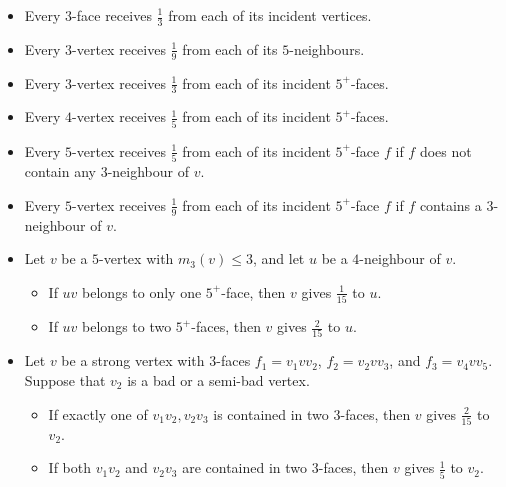\documentclass[12pt, reqno]{amsart}
\theoremstyle{plain}
\theoremstyle{definition}
\numberwithin{equation}{section}
\begin{document}
\begin{itemize}
\item[\textbf{R1:}] Every $3$-face  receives $\frac{1}{3}$  from each of its incident vertices.
\item[\textbf{R2:}] Every $3$-vertex receives $\frac{1}{9}$  from each of its  $5$-neighbours.
\item[\textbf{R3:}] Every $3$-vertex receives $\frac{1}{3}$  from each of its  incident $5^+$-faces.
\item[\textbf{R4:}] Every $4$-vertex receives $\frac{1}{5}$  from each of its  incident $5^+$-faces.
\item[\textbf{R5:}] Every $5$-vertex receives $\frac{1}{5}$  from each of its  incident $5^+$-face $f$ if $f$ does not contain any $3$-neighbour of $v$.
\item[\textbf{R6:}] Every $5$-vertex receives $\frac{1}{9}$  from each of its  incident $5^+$-face $f$ if $f$ contains a $3$-neighbour of $v$.

\item[\textbf{R7:}] Let $v$ be a $5$-vertex with $m_3(v)\leq 3$, and let $u$ be a $4$-neighbour of $v$.
\begin{itemize}
\item[(a)] If $uv$ belongs to only one $5^+$-face, then $v$ gives $\frac{1}{15}$ to $u$. 
\item[(b)] If $uv$ belongs to two $5^+$-faces, then $v$ gives $\frac{2}{15}$ to $u$. 
\end{itemize}

\item[\textbf{R8:}] Let $v$ be a strong vertex with $3$-faces $f_1=v_1vv_2$, $f_2=v_2vv_3$, and $f_3=v_4vv_5$. Suppose that  $v_2$ is a bad or a semi-bad vertex. 
\begin{itemize}

\item[(a)] If exactly one of $v_1v_2,v_2v_3$ is contained in two $3$-faces, then $v$ gives $\frac{2}{15}$ to $v_2$. 
\item[(b)] If both $v_1v_2$ and $v_2v_3$ are contained in two $3$-faces, then $v$ gives $\frac{1}{5}$ to $v_2$. 

\end{itemize}


\end{itemize}
\end{document}
